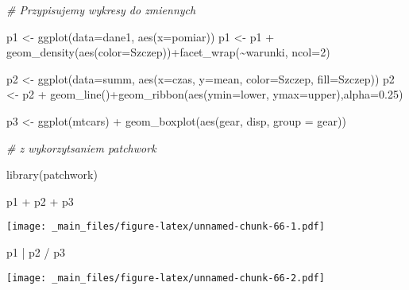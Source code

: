\documentclass[
]{book}
\newenvironment{Shaded}{\begin{snugshade}}{\end{snugshade}}
\newcommand{\AttributeTok}[1]{\textcolor[rgb]{0.77,0.63,0.00}{#1}}
\newcommand{\CommentTok}[1]{\textcolor[rgb]{0.56,0.35,0.01}{\textit{#1}}}
\newcommand{\DecValTok}[1]{\textcolor[rgb]{0.00,0.00,0.81}{#1}}
\newcommand{\FloatTok}[1]{\textcolor[rgb]{0.00,0.00,0.81}{#1}}
\newcommand{\FunctionTok}[1]{\textcolor[rgb]{0.00,0.00,0.00}{#1}}
\newcommand{\NormalTok}[1]{#1}
\newcommand{\OtherTok}[1]{\textcolor[rgb]{0.56,0.35,0.01}{#1}}
\newcommand{\SpecialCharTok}[1]{\textcolor[rgb]{0.00,0.00,0.00}{#1}}
\begin{document}
\begin{Shaded}
\begin{Highlighting}[]
\CommentTok{\# Przypisujemy wykresy do zmiennych}

\NormalTok{p1 }\OtherTok{\textless{}{-}} \FunctionTok{ggplot}\NormalTok{(}\AttributeTok{data=}\NormalTok{dane1, }\FunctionTok{aes}\NormalTok{(}\AttributeTok{x=}\NormalTok{pomiar))}
\NormalTok{p1 }\OtherTok{\textless{}{-}}\NormalTok{ p1 }\SpecialCharTok{+} \FunctionTok{geom\_density}\NormalTok{(}\FunctionTok{aes}\NormalTok{(}\AttributeTok{color=}\NormalTok{Szczep))}\SpecialCharTok{+}\FunctionTok{facet\_wrap}\NormalTok{(}\SpecialCharTok{\textasciitilde{}}\NormalTok{warunki, }\AttributeTok{ncol=}\DecValTok{2}\NormalTok{)}

\NormalTok{p2 }\OtherTok{\textless{}{-}} \FunctionTok{ggplot}\NormalTok{(}\AttributeTok{data=}\NormalTok{summ, }\FunctionTok{aes}\NormalTok{(}\AttributeTok{x=}\NormalTok{czas, }\AttributeTok{y=}\NormalTok{mean, }\AttributeTok{color=}\NormalTok{Szczep, }\AttributeTok{fill=}\NormalTok{Szczep))}
\NormalTok{p2 }\OtherTok{\textless{}{-}}\NormalTok{ p2 }\SpecialCharTok{+} \FunctionTok{geom\_line}\NormalTok{()}\SpecialCharTok{+}\FunctionTok{geom\_ribbon}\NormalTok{(}\FunctionTok{aes}\NormalTok{(}\AttributeTok{ymin=}\NormalTok{lower, }\AttributeTok{ymax=}\NormalTok{upper),}\AttributeTok{alpha=}\FloatTok{0.25}\NormalTok{)}

\NormalTok{p3 }\OtherTok{\textless{}{-}} \FunctionTok{ggplot}\NormalTok{(mtcars) }\SpecialCharTok{+} \FunctionTok{geom\_boxplot}\NormalTok{(}\FunctionTok{aes}\NormalTok{(gear, disp, }\AttributeTok{group =}\NormalTok{ gear))}

\CommentTok{\# z wykorzytsaniem patchwork}

\FunctionTok{library}\NormalTok{(patchwork)}

\NormalTok{p1 }\SpecialCharTok{+}\NormalTok{ p2 }\SpecialCharTok{+}\NormalTok{ p3}
\end{Highlighting}
\end{Shaded}

\texttt{[image: \_main\_files/figure-latex/unnamed-chunk-66-1.pdf]}

\begin{Shaded}
\begin{Highlighting}[]
\NormalTok{p1 }\SpecialCharTok{|}\NormalTok{ p2 }\SpecialCharTok{/}\NormalTok{ p3}
\end{Highlighting}
\end{Shaded}

\texttt{[image: \_main\_files/figure-latex/unnamed-chunk-66-2.pdf]}
\end{document}
